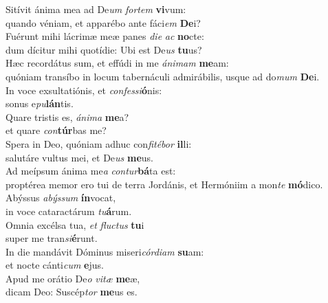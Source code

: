 \evenverse Sitívit ánima mea ad De\textit{um} \textit{for}\textit{tem} \textbf{vi}vum:~\*\\
\evenverse quando véniam, et apparébo ante fáci\textit{em} \textbf{De}i?\\
\oddverse Fuérunt mihi lácrimæ meæ panes \textit{di}\textit{e} \textit{ac} \textbf{no}cte:~\*\\
\oddverse dum dícitur mihi quotídie: Ubi est De\textit{us} \textbf{tu}us?\\
\evenverse Hæc recordátus sum, et effúdi in me \textit{á}\textit{ni}\textit{mam} \textbf{me}am:~\*\\
\evenverse quóniam transíbo in locum tabernáculi admirábilis, usque ad do\textit{mum} \textbf{De}i.\\
\oddverse In voce exsultatiónis, et \textit{con}\textit{fes}\textit{si}\textbf{ó}nis:~\*\\
\oddverse sonus e\textit{pu}\textbf{lán}tis.\\
\evenverse Quare tristis es, \textit{á}\textit{ni}\textit{ma} \textbf{me}a?~\*\\
\evenverse et quare \textit{con}\textbf{túr}bas me?\\
\oddverse Spera in Deo, quóniam adhuc con\textit{fi}\textit{té}\textit{bor} \textbf{il}li:~\*\\
\oddverse salutáre vultus mei, et De\textit{us} \textbf{me}us.\\
\evenverse Ad meípsum ánima me\textit{a} \textit{con}\textit{tur}\textbf{bá}ta est:~\*\\
\evenverse proptérea memor ero tui de terra Jordánis, et Hermóniim a mon\textit{te} \textbf{mó}dico.\\
\oddverse Abýssus \textit{a}\textit{býs}\textit{sum} \textbf{ín}vocat,~\*\\
\oddverse in voce cataractárum \textit{tu}\textbf{á}rum.\\
\evenverse Omnia excélsa tua, \textit{et} \textit{flu}\textit{ctus} \textbf{tu}i~\*\\
\evenverse super me tran\textit{si}\textbf{é}runt.\\
\oddverse In die mandávit Dóminus miseri\textit{cór}\textit{di}\textit{am} \textbf{su}am:~\*\\
\oddverse et nocte cánti\textit{cum} \textbf{e}jus.\\
\evenverse Apud me orátio De\textit{o} \textit{vi}\textit{tæ} \textbf{me}æ,~\*\\
\evenverse dicam Deo: Suscép\textit{tor} \textbf{me}us es.\\
